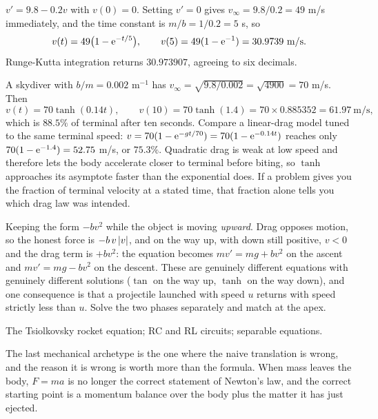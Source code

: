 \begin{worked}
$v'=9.8-0.2v$ with $v(0)=0$. Setting $v'=0$ gives $v_\infty=9.8/0.2=49$ m/s immediately, and the time constant is $m/b=1/0.2=5$ s, so
\[v(t)=49\bigl(1-\mathrm{e}^{-t/5}\bigr),\qquad v(5)=49(1-\mathrm{e}^{-1})=30.9739\ \text{m/s}.\]
Runge-Kutta integration returns $30.973907$, agreeing to six decimals.
\end{worked}

\begin{worked}
A skydiver with $b/m=0.002$ m$^{-1}$ has $v_\infty=\sqrt{9.8/0.002}=\sqrt{4900}=70$ m/s. Then
\[v(t)=70\tanh(0.14t),\qquad v(10)=70\tanh(1.4)=70\times0.885352=61.97\ \text{m/s},\]
which is $88.5\%$ of terminal after ten seconds. Compare a linear-drag model tuned to the same terminal speed: $v=70(1-\mathrm{e}^{-gt/70})=70(1-\mathrm{e}^{-0.14t})$ reaches only $70(1-\mathrm{e}^{-1.4})=52.75$ m/s, or $75.3\%$. Quadratic drag is weak at low speed and therefore lets the body accelerate closer to terminal before biting, so $\tanh$ approaches its asymptote faster than the exponential does. If a problem gives you the fraction of terminal velocity at a stated time, that fraction alone tells you which drag law was intended.
\end{worked}

\begin{trap}
Keeping the form $-bv^{2}$ while the object is moving \emph{upward}. Drag opposes motion, so the honest force is $-b\,v\left\lvert v\right\rvert$, and on the way up, with down still positive, $v<0$ and the drag term is $+bv^{2}$: the equation becomes $mv'=mg+bv^{2}$ on the ascent and $mv'=mg-bv^{2}$ on the descent. These are genuinely different equations with genuinely different solutions ($\tan$ on the way up, $\tanh$ on the way down), and one consequence is that a projectile launched with speed $u$ returns with speed strictly less than $u$. Solve the two phases separately and match at the apex.
\end{trap}

\begin{seealsob}The Tsiolkovsky rocket equation; RC and RL circuits; separable equations.\end{seealsob}

The last mechanical archetype is the one where the naive translation is wrong, and the reason it is wrong is worth more than the formula. When mass leaves the body, $F=ma$ is no longer the correct statement of Newton's law, and the correct starting point is a momentum balance over the body plus the matter it has just ejected.

